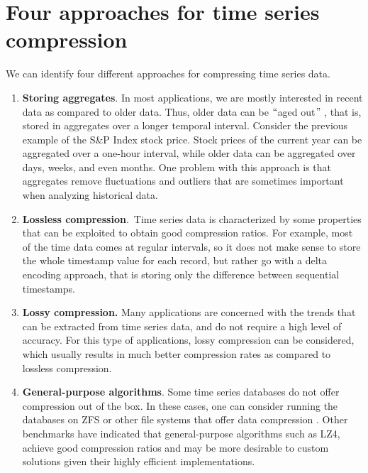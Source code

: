 \section{Four approaches for time series compression}
We can identify four different approaches for compressing time series data.
\begin{enumerate}
    \item \textbf{Storing aggregates}. In most applications, we are mostly interested in
    recent data as compared to older data. Thus, older data can be $``$aged out$"$ , that is,
    stored in aggregates over a longer temporal interval. Consider the previous example of
    the S\&P Index stock price. Stock prices of the current year can be aggregated over a
    one-hour interval, while older data can be aggregated over days, weeks, and even months.
    One problem with this approach is that aggregates remove fluctuations and outliers that
    are sometimes important when analyzing historical data.
    \item \textbf{Lossless compression}.\ Time series data is characterized by some properties
    that can be exploited to obtain good compression ratios.  For example, most of the time
    data comes at regular intervals, so it does not make sense to store the whole timestamp
    value for each record, but rather go with a delta encoding approach, that is storing only
    the difference between sequential timestamps.
    \item \textbf{Lossy compression. }Many applications are concerned with the trends that
    can be extracted from time series data, and do not require a high level of accuracy. For
    this type of applications, lossy compression can be considered, which usually results in
    much better compression rates as compared to lossless compression.
    \item \textbf{General-purpose algorithms}. Some time series databases do not offer
    compression out of the box. In these cases, one can consider running the databases on
    ZFS or other file systems that offer data compression \cite{A2019TimescaleDB}. Other
    benchmarks \cite{Danjou2016Timeseries} have indicated that general-purpose algorithms
    such as LZ4, achieve good compression ratios and may be more desirable to custom solutions
    given their highly efficient implementations.
\end{enumerate}